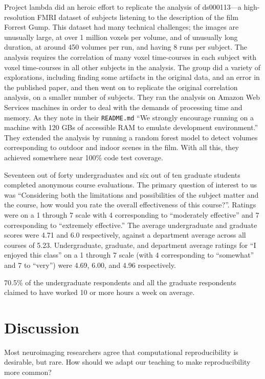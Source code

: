 Project lambda did an heroic effort to replicate the analysis of ds000113---a
high-resolution FMRI dataset of subjects listening to the description of the
film Forrest Gump.  This dataset had many technical challenges; the images are
unusually large, at over 1 million voxels per volume, and of unusually long
duration, at around 450 volumes per run, and having 8 runs per subject.  The
analysis requires the correlation of many voxel time-courses in each subject
with voxel time-courses in all other subjects in the analysis.  The group did
a variety of explorations, including finding some artifacts in the original
data, and an error in the published paper, and then went on to replicate the
original correlation analysis, on a smaller number of subjects.  They ran the
analysis on Amazon Web Services machines in order to deal with the demands of
processing time and memory.  As they note in their \texttt{README.md} ``We
strongly encourage running on a machine with 120 GBs of accessible RAM to
emulate development environment.'' They extended the analysis by running a
random forest model to detect volumes corresponding to outdoor and indoor
scenes in the film.  With all this, they achieved somewhere near 100\% code
test coverage.

Seventeen out of forty undergraduates and six out of ten graduate students
completed anonymous course evaluations.  The primary question of interest to
us was ``Considering both the limitations and possibilities of the subject
matter and the course, how would you rate the overall effectiveness of this
course?''.  Ratings were on a 1 through 7 scale with 4 corresponding to
``moderately effective'' and 7 corresponding to ``extremely effective.''
The average undergraduate and graduate scores were
4.71 and 6.0 respectively, against a department average across all courses of
5.23.  Undergraduate, graduate, and department average ratings for ``I enjoyed
this class'' on a 1 through 7 scale (with 4 corresponding to
``somewhat'' and 7 to ``very'')
were 4.69, 6.00, and 4.96 respectively.

70.5\% of the undergraduate respondents and all the graduate respondents
claimed to have worked 10 or more hours a week on average.

\section{Discussion}\label{discussion}

Most neuroimaging researchers agree that computational reproducibility is
desirable, but rare.  How should we adapt our teaching to make reproducibility
more common?

